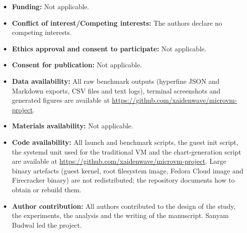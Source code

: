 \documentclass[pdflatex,sn-mathphys-num]{sn-jnl}%
\begin{document}
\begin{itemize}
\item \textbf{Funding:} Not applicable.
\item \textbf{Conflict of interest/Competing interests:} The authors declare no competing interests.
\item \textbf{Ethics approval and consent to participate:} Not applicable.
\item \textbf{Consent for publication:} Not applicable.
\item \textbf{Data availability:} All raw benchmark outputs (hyperfine JSON and Markdown exports, CSV files and text logs), terminal screenshots and generated figures are available at \url{https://github.com/xaidenwave/microvm-project}.
\item \textbf{Materials availability:} Not applicable.
\item \textbf{Code availability:} All launch and benchmark scripts, the guest init script, the systemd unit used for the traditional VM and the chart-generation script are available at \url{https://github.com/xaidenwave/microvm-project}. Large binary artefacts (guest kernel, root filesystem image, Fedora Cloud image and Firecracker binary) are not redistributed; the repository documents how to obtain or rebuild them.
\item \textbf{Author contribution:} All authors contributed to the design of the study, the experiments, the analysis and the writing of the manuscript. Sanyam Budwal led the project.
\end{itemize}


\end{document}
